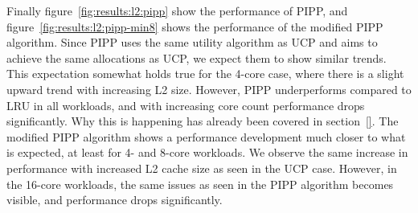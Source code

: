 Finally figure~\ref{fig:results:l2:pipp} show the performance of PIPP, and figure~\ref{fig:results:l2:pipp-min8} shows the performance of the modified PIPP algorithm.
Since PIPP uses the same utility algorithm as UCP and aims to achieve the same allocations as UCP, we expect them to show similar trends.
This expectation somewhat holds true for the 4-core case, where there is a slight upward trend with increasing L2 size.
However, PIPP underperforms compared to LRU in all workloads, and with increasing core count performance drops significantly.
Why this is happening has already been covered in section~\ref{}.
The modified PIPP algorithm shows a performance development much closer to what is expected, at least for 4- and 8-core workloads.
We observe the same increase in performance with increased L2 cache size as seen in the UCP case. 
However, in the 16-core workloads, the same issues as seen in the PIPP algorithm becomes visible, and performance drops significantly.



